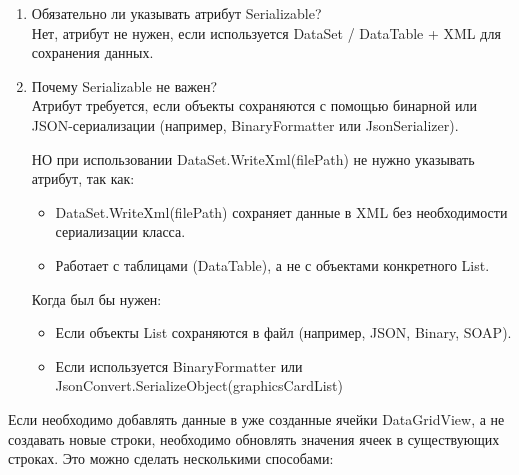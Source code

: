\documentclass[12pt]{article}
\newcommand{\icon}[1]{\fontspec{UbuntuNerdFont}[Extension = .ttf,
  Path = /nix/store/h721jafy2n74x4k5p0hxbz722h0rncmx-nerd-fonts-ubuntu-3.3.0+0.83/share/fonts/truetype/NerdFonts/Ubuntu/,
  UprightFont = *-Regular,
BoldFont = *-Bold] #1}
\newcommand{\iicon}[1]{{\icon{#1}}}
\renewcommand{\texttt}[1]{{\small\ttfamily #1}}
\numberwithin{listing}{section}
\numberwithin{figure}{section}
\begin{document}
\begin{enumerate}
	\item Обязательно ли указывать атрибут \texttt{Serializable}? \\
	      Нет, атрибут \texttt{[Serializable]} не нужен, если используется \texttt{DataSet} / \texttt{DataTable} + \texttt{XML} для сохранения данных.

	\item Почему \texttt{Serializable} не важен? \\
	      Атрибут \texttt{[Serializable]} требуется, если объекты сохраняются с помощью бинарной или \texttt{JSON}-сериализации (например, \texttt{BinaryFormatter} или \texttt{JsonSerializer}).

	      \textcolor{CtpRed}{НО} при использовании \texttt{DataSet.WriteXml(filePath)} не нужно указывать атрибут, так как:
	      \begin{itemize}
		      \item[\iicon{󰄬}] \texttt{DataSet.WriteXml(filePath)} сохраняет данные в \texttt{XML} без необходимости сериализации класса.
		      \item[\iicon{󰄬}] Работает с таблицами (\texttt{DataTable}), а не с объектами конкретного \texttt{List}.
	      \end{itemize}

	      Когда \texttt{[Serializable]} был бы нужен:
	      \begin{itemize}
		      \item Если объекты \texttt{List} сохраняются в файл (например, \texttt{JSON}, \texttt{Binary}, \texttt{SOAP}).
		      \item Если используется \texttt{BinaryFormatter} или \texttt{JsonConvert.Serialize\-Object(graphics\-CardList)}
	      \end{itemize}
\end{enumerate}

Если необходимо добавлять данные в уже созданные ячейки \texttt{DataGridView}, а не создавать новые строки, необходимо обновлять значения ячеек в существующих строках. Это можно сделать несколькими способами:
\end{document}
